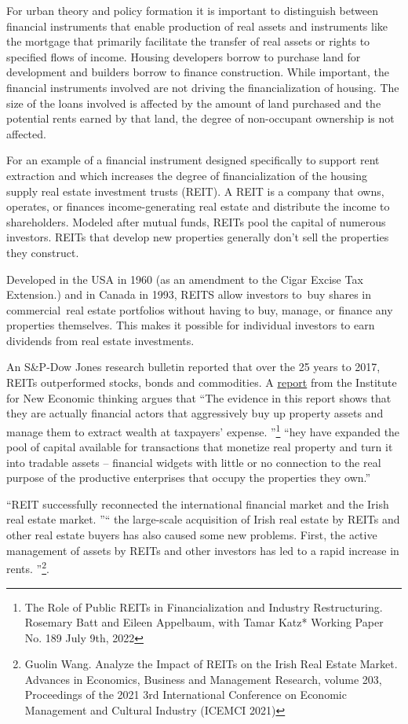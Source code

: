 For urban theory and policy formation it is important to distinguish between financial instruments that enable production of real assets and instruments like the mortgage that primarily facilitate the transfer of real assets or rights to specified flows of income. Housing developers borrow to purchase land for development and builders borrow to finance construction. While important, the financial instruments involved are not driving the financialization of housing.  The size of the loans involved is affected by the amount of land purchased and the potential rents earned by that land, the degree of non-occupant ownership is not affected.

For an example of a financial instrument designed specifically to support rent extraction and which  increases the degree of financialization of the housing supply  real estate investment trusts (REIT). A REIT is a company that owns, operates, or finances income-generating real estate and distribute the income to shareholders. Modeled after mutual funds, REITs pool the capital of numerous investors. REITs that develop new properties generally don't sell the properties they construct.

Developed in the USA  in 1960 (as an amendment to the Cigar Excise Tax Extension.) and in Canada in 1993, REITS allow investors to buy shares in commercial real estate portfolios without having to buy, manage, or finance any properties themselves. This makes it possible for individual investors to earn dividends from real estate investments.  

An S\&P-Dow Jones research bulletin reported that over the  25 years to 2017, REITs outperformed stocks, bonds and commodities. A \href{https://www.ineteconomics.org/research/research-papers/the-role-of-public-reits-in-financialization-and-industry-restructuring}{report} from the Institute for New Economic thinking argues that ``The evidence in this report shows that they are actually financial actors that aggressively buy up property assets and manage them to extract wealth at taxpayers’ expense. ''\footnote{The Role of Public REITs in Financialization and Industry Restructuring. Rosemary Batt and Eileen Appelbaum, with Tamar Katz* Working Paper No. 189 July 9th, 2022} ``hey have expanded the pool of capital available for transactions that monetize real property and turn it into tradable assets – financial widgets with little or no connection to the real purpose of the productive enterprises that occupy the properties they own.''


``REIT successfully reconnected the international financial market and the Irish real estate market. ''`` the large-scale acquisition of Irish real estate by REITs and other real estate buyers has also caused some new problems. First, the active management of assets by REITs and other investors has led to a rapid increase in rents. ''\footnote{ Guolin Wang. Analyze the Impact of REITs on the Irish Real Estate Market. Advances in Economics, Business and Management Research, volume 203, Proceedings of the 2021 3rd International Conference on Economic Management and Cultural Industry (ICEMCI 2021)}. 



